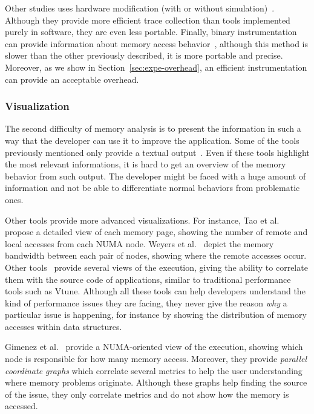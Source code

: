 Other studies uses hardware modification (with or without simulation)~\cite{Bao08HMTT,Martonosi92MemSpy}.
Although they provide more efficient trace collection than tools implemented purely in software, they are even less portable.
Finally, binary instrumentation can provide information about memory access behavior~\cite{DeRose02SIGMA}, although this method is slower than
the other previously described, it is more portable and precise. Moreover, as
we show in Section~\ref{sec:expe-overhead}, an efficient instrumentation can
provide an acceptable overhead.

\subsubsection{Visualization}

The second difficulty of memory analysis is to present the information in such
a way that the developer can use it to improve the application. Some of the tools
previously mentioned only provide a textual
output~\cite{Lachaize12MemProf,McCurdy2010,Martonosi92MemSpy}. Even if these
tools highlight the most relevant informations, it is hard to get an overview
of the memory behavior from such output. The developer might be faced with a huge
amount of information and not be able to differentiate normal behaviors from
problematic ones.


Other tools provide more advanced visualizations. For
instance, Tao et al.~\cite{Tao01Visualizing} propose a detailed view of each memory
page, showing the number of remote and local accesses from each NUMA node. Weyers et
al.~\cite{Weyers14Visualization} depict the memory bandwidth between each pair of nodes,
showing where the remote accesses occur. Other
tools~\cite{DeRose01Hardware,DeRose02SIGMA,Bosch00Rivet} provide several views
of the execution, giving the ability to correlate them with the source code of applications, similar to traditional performance tools such as Vtune. Although
all these tools can help developers understand the kind of
performance issues they are facing, they never give the reason \emph{why} a particular
issue is happening, for instance by showing the distribution of memory accesses within data structures.

Gimenez et al.~\cite{Gimenez14Dissecting} provide a NUMA-oriented view of the
execution, showing which node is responsible for how many memory access.
Moreover, they provide \emph{parallel coordinate graphs} which correlate
several metrics to help the user understanding where memory
problems originate. Although these graphs help finding
the source of the issue, they only correlate metrics and do not show how the memory
is accessed.

